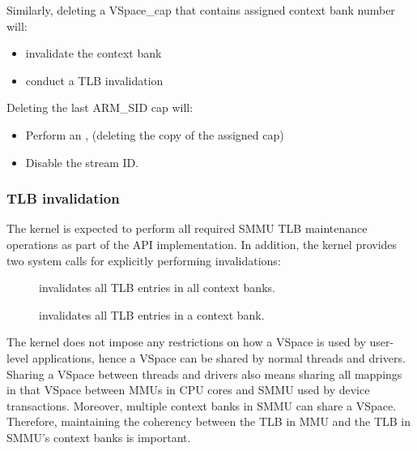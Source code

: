 Similarly, deleting a VSpace\_cap that contains assigned context bank number will:
\begin{itemize}
    \item invalidate the context bank
    \item conduct a TLB invalidation
\end{itemize}

Deleting the last ARM\_SID cap will:
\begin{itemize}
    \item Perform an , 
        (deleting the copy of the assigned  cap)
    \item Disable the stream ID.
\end{itemize}

\subsubsection{TLB invalidation}
\label{sec:smmuv2-tlb-invalidation}
The kernel is expected to perform all required SMMU TLB maintenance operations
as part of the API implementation.  In addition, the kernel provides two system
calls for explicitly performing invalidations:
\begin{description}
    \item[]
        invalidates all TLB entries in all
    context banks.
    \item[]
        invalidates all TLB entries in a context bank.
\end{description}

The kernel does not impose any restrictions on how a VSpace is used by user-level
applications, hence a VSpace can be shared by normal threads and drivers. Sharing
a VSpace between threads and drivers also means sharing all mappings in that
VSpace between MMUs in CPU cores and SMMU used by device transactions. Moreover,
multiple context banks in SMMU can share a VSpace. Therefore, maintaining the
coherency between the TLB in MMU and the TLB in SMMU's context banks is important.

